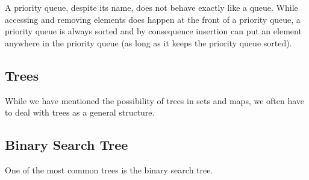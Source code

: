A priority queue, despite its name, does not behave exactly like a queue. While accessing and removing elements does happen at the front of a priority queue, a priority queue is always sorted and by consequence insertion can put an element anywhere in the priority queue (as long as it keeps the priority queue sorted).

\subsection{Trees}

While we have mentioned the possibility of trees in sets and maps, we often have to deal with trees as a general structure.

\subsection{Binary Search Tree}

One of the most common trees is the binary search tree.